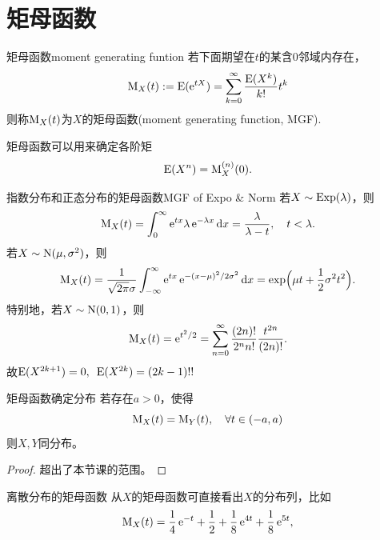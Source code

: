 \section{矩母函数}
\begin{definition}{矩母函数}{moment generating funtion}
	若下面期望在$t$的某含0邻域内存在，
	\begin{equation}\label{MGF def}
		\operatorname{M}_X(t) := \operatorname{E}(\mathop{}\!\mathrm{e}^{tX}) = \sum_{k=0}^\infty\frac{\operatorname{E}(X^k)}{k!}t^k
	\end{equation}
	则称$\operatorname{M}_X(t)$为$X$的矩母函数(moment generating function, MGF).
\end{definition}
矩母函数可以用来确定各阶矩
\begin{equation}
	\operatorname{E}(X^n) = \operatorname{M}_X^{(n)}(0).
\end{equation}
\begin{example}{指数分布和正态分布的矩母函数}{MGF of Expo & Norm}
	若$X \sim \operatorname{Exp}(\lambda)$，则
	\begin{equation}\label{eq:ps-exponential-mgf}
		\operatorname{M}_X(t) = \int_0^\infty\mathop{}\!\mathrm{e}^{tx}\lambda\mathop{}\!\mathrm{e}^{-\lambda x}\mathop{}\!\mathrm{d} x = \frac\lambda{\lambda - t},\quad t < \lambda.
	\end{equation}
	\tcblower
	若$X \sim \operatorname{N}(\mu,\sigma^2)$，则
	\begin{equation}\label{eq:ps-normal-mgf}
		\operatorname{M}_X(t) = \frac1{\sqrt{2\pi}\sigma}\int_{-\infty}^\infty\mathop{}\!\mathrm{e}^{tx}\mathop{}\!\mathrm{e}^{-(x-\mu)^2/2\sigma^2}\mathop{}\!\mathrm{d} x = \exp\Bigl(\mu t + \frac12\sigma^2t^2\Bigr).
	\end{equation}
	特别地，若$X \sim \operatorname{N}(0,1)$，则
	\[
		\operatorname{M}_X(t) = \mathop{}\!\mathrm{e}^{t^2/2} = \sum_{n=0}^\infty\frac{(2n)!}{2^nn!}\frac{t^{2n}}{(2n)!}.
	\]
	故$\operatorname{E}(X^{2k+1}) = 0,\enspace\operatorname{E}(X^{2k}) = (2k - 1)!!$
\end{example}
\begin{theorem}{矩母函数确定分布}{}
	若存在$a > 0$，使得
	\begin{equation}\label{eq:ps-mgf-uniqueness}
		\operatorname{M}_X(t) = \operatorname{M}_Y(t),\quad\forall t \in (-a,a)
	\end{equation}
	则$X,Y$同分布。
\end{theorem}
\begin{proof}
	超出了本节课的范围。
\end{proof}
\begin{example}{离散分布的矩母函数}{}
	从$X$的矩母函数可直接看出$X$的分布列，比如
	\[
		\operatorname{M}_X(t) = \frac14\mathop{}\!\mathrm{e}^{-t} + \frac12 + \frac18\mathop{}\!\mathrm{e}^{4t} + \frac18\mathop{}\!\mathrm{e}^{5t},
	\]

\end{example}
